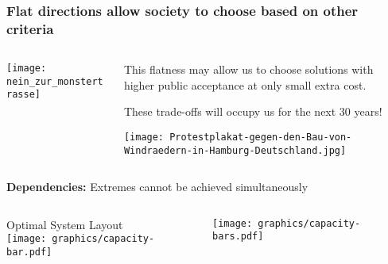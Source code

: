 \documentclass[10pt,aspectratio=169,dvipsnames]{beamer}
\begin{document}
\begin{frame}[fragile]
  \frametitle{Flat directions allow society to choose based on other criteria}



\begin{columns}[T]

  \begin{column}{5cm}


\centering
\texttt{[image: nein\_zur\_monstertrasse]}

  \end{column}


  \begin{column}{6.7cm}

    \vspace{.5cm}

    This flatness may allow us to choose solutions with \alert{higher
      public acceptance} at only \alert{small extra cost}.

    \vspace{.5cm}

    These trade-offs will occupy us for the next 30 years!

    \vspace{.5cm}

\texttt{[image: Protestplakat-gegen-den-Bau-von-Windraedern-in-Hamburg-Deutschland.jpg]}

  \end{column}

\end{columns}

\end{frame}


\begin{frame}{\textbf{Dependencies:} Extremes cannot be achieved simultaneously}

  \begin{columns}

    \begin{column}{0.4\textwidth}
      \begin{center}
        \vspace{-0.5cm}
        \footnotesize Optimal System Layout\\
        \texttt{[image: graphics/capacity-bar.pdf]}
      \end{center}
    \end{column}
    \begin{column}{0.6\textwidth}
      \begin{center}
        \vspace{.3cm}
        \texttt{[image: graphics/capacity-bars.pdf]}
      \end{center}
    \end{column}

  \end{columns}

\end{frame}
\end{document}
